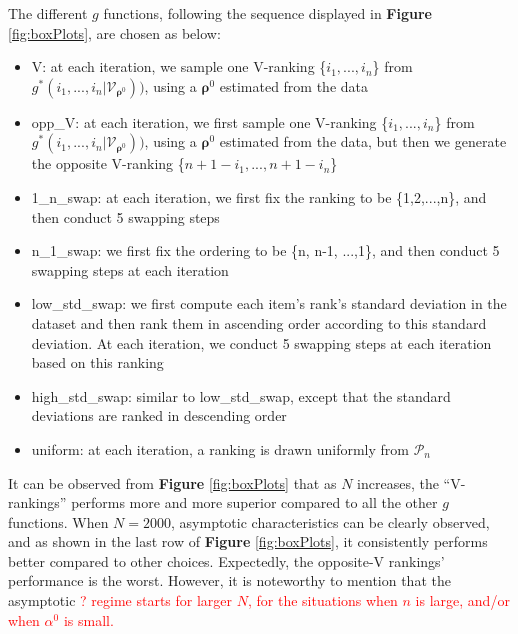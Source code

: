 \documentclass[11pt, oneside]{article}   	%
\begin{document}
The different $g$ functions, following the sequence displayed in \textbf{Figure} \ref{fig:boxPlots}, are chosen as below:
\begin{itemize}
	\item {V: at each iteration, we sample one V-ranking \{$i_1, ...,i_n$\} from $g^*(i_1, ..., i_n | \mathcal{V}_{\bm{\rho}^0}))$, using a $\bm{\rho}^0$ estimated from the data}
	\item {opp\_V: at each iteration, we first sample one V-ranking \{$i_1, ...,i_n$\} from $g^*(i_1, ..., i_n | \mathcal{V}_{\bm{\rho}^0}))$, using a $\bm{\rho}^0$ estimated from the data, but then we generate the opposite V-ranking \{$n+1 - i_1, ..., n+1 - i_n$\}}
	\item {1\_n\_swap: at each iteration, we first fix the ranking to be \{1,2,...,n\}, and then conduct 5 swapping steps}
	\item {n\_1\_swap: we first fix the ordering to be \{n, n-1, ...,1\}, and then conduct 5 swapping steps at each iteration}
	\item {low\_std\_swap: we first compute each item's rank's standard deviation in the dataset and then rank them in ascending order according to this standard deviation. At each iteration, we conduct 5 swapping steps at each iteration based on this ranking }
	\item {high\_std\_swap: similar to low\_std\_swap, except that the standard deviations are ranked in descending order}
	\item{uniform: at each iteration, a ranking is drawn uniformly from $\mathcal{P}_n$}
\end{itemize}

It can be observed from \textbf{Figure} \ref{fig:boxPlots} that as $N$ increases, the ``V-rankings'' performs more and more superior compared to all the other $g$ functions. When $N = 2000$, asymptotic characteristics can be clearly observed, and as shown in the last row of \textbf{Figure} \ref{fig:boxPlots}, it consistently performs better compared to other choices. Expectedly, the opposite-V rankings' performance is the worst. However, it is noteworthy to mention that the asymptotic \textcolor{red}{? regime starts for larger $N$, for the situations when $n$ is large, and/or when $\alpha^0$ is small.} %
\end{document}
